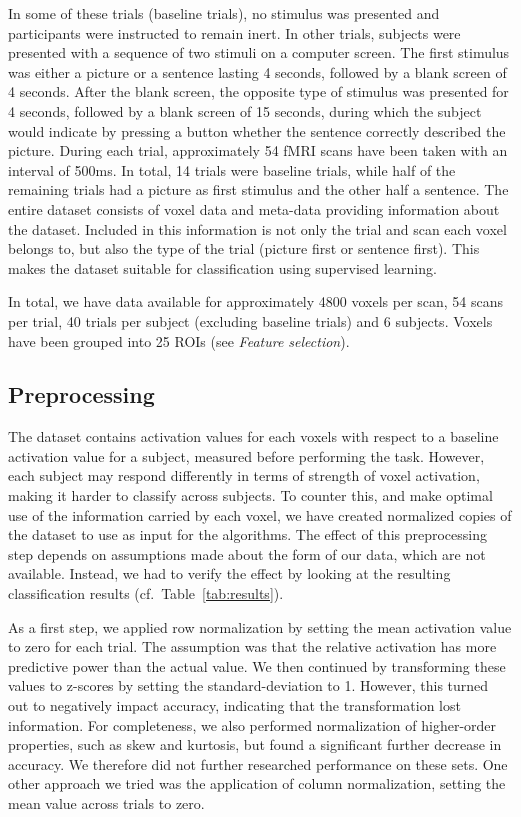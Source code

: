 \documentclass[preprint,journal,11pt]{vgtc}
\begin{document}
In some of these trials (baseline trials), no stimulus was presented and participants were instructed to remain inert. In other trials, subjects were presented with a sequence of two stimuli on a computer screen. The first stimulus was either a picture or a sentence lasting 4 seconds, followed by a blank screen of 4 seconds. After the blank screen, the opposite type of stimulus was presented for 4 seconds, followed by a blank screen of 15 seconds, during which the subject would indicate by pressing a button whether the sentence correctly described the picture. During each trial, approximately 54 fMRI scans have been taken with an interval of 500ms. In total, 14 trials were baseline trials, while half of the remaining trials had a picture as first stimulus and the other half a sentence.  
The entire dataset consists of voxel data and meta-data providing information about the dataset. Included in this information is not only the trial and scan each voxel belongs to, but also the type of the trial (picture first or sentence first). This makes the dataset suitable for classification using supervised learning.

In total, we have data available for approximately 4800 voxels per scan, 54 scans per trial, 40 trials per subject (excluding baseline trials) and 6 subjects. Voxels have been grouped into 25 ROIs (see \textit{Feature selection}).

\subsection{Preprocessing}
\label{ssec:preprocessing}
The dataset contains activation values for each voxels with respect to a baseline activation value for a subject, measured before performing the task. However, each subject may respond differently in terms of strength of voxel activation, making it harder to classify across subjects. To counter this, and make optimal use of the information carried by each voxel, we have created normalized copies of the dataset to use as input for the algorithms. The effect of this preprocessing step depends on assumptions made about the form of our data, which are not available. Instead, we had to verify the effect by looking at the resulting classification results (cf.~Table~\ref{tab:results}).

As a first step, we applied row normalization by setting the mean activation value to zero for each trial. The assumption was that the relative activation has more predictive power than the actual value. We then continued by transforming these values to z-scores by setting the standard-deviation to 1. However, this turned out to negatively impact accuracy, indicating that the transformation lost information. For completeness, we also performed normalization of higher-order properties, such as skew and kurtosis, but found a significant further decrease in accuracy. We therefore did not further researched performance on these sets. One other approach we tried was the application of column normalization, setting the mean value across trials to zero. 
\end{document}
